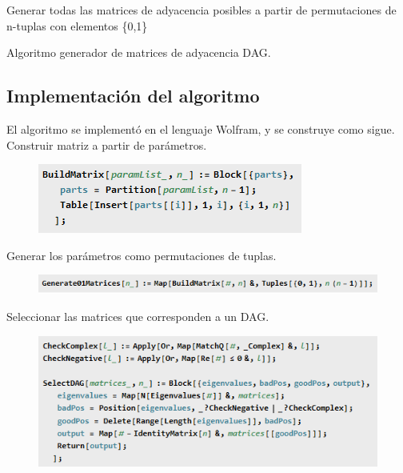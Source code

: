 \documentclass[10pt,a4paper]{article}
\begin{document}
\begin{algorithm}[H]
 Generar todas las matrices de adyacencia posibles a partir de permutaciones de n-tuplas con elementos \{0,1\}\;
 \caption{Algoritmo generador de matrices de adyacencia DAG.}
\end{algorithm}

\subsection{Implementación del algoritmo}
El algoritmo se implementó en el lenguaje Wolfram, y se construye como sigue.
Construir matriz a partir de parámetros.
\begin{figure}[H]
\centering
\includegraphics[scale=0.6]{img/codigo1}
\end{figure}

Generar los parámetros como permutaciones de tuplas.

\begin{figure}[H]
\centering
\includegraphics[scale=0.6]{img/codigo2}
\end{figure}

Seleccionar las matrices que corresponden a un DAG.

\begin{figure}[H]
\centering
\includegraphics[scale=0.6]{img/codigo3}
\end{figure}
\end{document}
